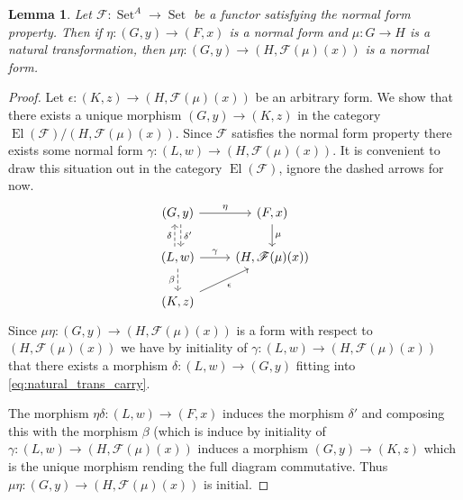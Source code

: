 \documentclass[12pt]{article}
\theoremstyle{plain}
\newtheorem{lemma}[thm]{Lemma}
\theoremstyle{definition}
\newcommand{\scr}[1]{\mathscr{#1}}
\newcommand{\lto}{\longrightarrow}
\DeclareMathOperator{\set}{Set}
\begin{document}
	\begin{lemma}\label{lem:nat_trans_carry}
		Let $\scr{F}: \set^A \lto \set$ be a functor satisfying the normal form property. Then if $\eta: (G,y) \lto (F,x)$ is a normal form and $\mu: G \lto H$ is a natural transformation, then $\mu \eta: (G,y) \lto (H, \scr{F}(\mu)(x))$ is a normal form.
	\end{lemma}
	\begin{proof}
		Let $\epsilon: (K, z) \lto (H, \scr{F}(\mu)(x))$ be an arbitrary form. We show that there exists a unique morphism $(G,y) \lto (K,z)$ in the category $\operatorname{El}(\scr{F})/(H, \scr{F}(\mu)(x))$. Since $\scr{F}$ satisfies the normal form property there exists some normal form $\gamma:(L,w) \lto (H, \scr{F}(\mu)(x))$. It is convenient to draw this situation out in the category $\operatorname{El}(\scr{F})$, ignore the dashed arrows for now.
		\begin{equation}\label{eq:natural_trans_carry}
			\begin{tikzcd}
				{(G,y)}\arrow[r, "\eta"]\arrow[d, shift left, "{\delta'}"', dashed, swap] & {(F, x)}\arrow[d, "\mu"] \\
				{(L,w)}\arrow[r, "\gamma"]\arrow[d, "\beta"', dashed]\arrow[u, shift left, "\delta", dashed] & {(H, \scr{F}(\mu)(x))} \\
				{(K,z)}\arrow[ur,"\epsilon"']
			\end{tikzcd}
		\end{equation}
		Since $\mu\eta: (G,y) \lto (H, \scr{F}(\mu)(x))$ is a form with respect to $(H, \scr{F}(\mu)(x))$ we have by initiality of $\gamma: (L,w) \lto (H, \scr{F}(\mu)(x))$ that there exists a morphism $\delta: (L,w) \lto (G,y)$ fitting into \eqref{eq:natural_trans_carry}.
		
		The morphism $\eta \delta: (L,w) \lto (F,x)$ induces the morphism $\delta'$ and composing this with the morphism $\beta$ (which is induce by initiality of $\gamma: (L, w) \lto (H, \scr{F}(\mu)(x))$ induces a morphism $(G,y) \lto (K,z)$ which is the unique morphism rending the full diagram commutative. Thus $\mu\eta: (G,y) \lto (H, \scr{F}(\mu)(x))$ is initial.
	\end{proof}
 
\end{document}

